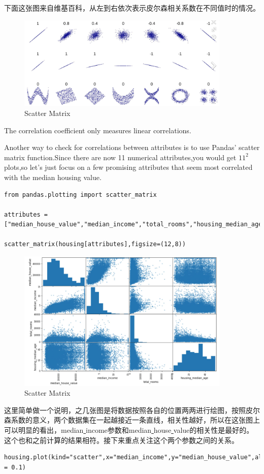 \documentclass[UTF8]{ctexart}
\begin{document}
下面这张图来自维基百科，从左到右依次表示皮尔森相关系数在不同值时的情况。

\begin{figure}[H]
\centering
\includegraphics[width = 4in]{scatter_matrix.JPG}
\caption{Scatter Matrix}
\end{figure}

The correlation coefficient only measures linear correlations.

Another way to check for correlations between attributes is to use Pandas' scatter\underline{ }matrix function.Since there are now 11 numerical attributes,you would get $11^2$ plots,so let's just focus on a few promising attributes that seem most correlated with the median housing value.

\begin{lstlisting}
from pandas.plotting import scatter_matrix

attributes = ["median_house_value","median_income","total_rooms","housing_median_age"]

scatter_matrix(housing[attributes],figsize=(12,8))
\end{lstlisting}


\begin{figure}[H]
\centering
\includegraphics[width = 4in]{scatter_col.JPG}
\caption{Scatter Matrix}
\end{figure}

这里简单做一个说明，之几张图是将数据按照各自的位置两两进行绘图，按照皮尔森系数的意义，两个数据集在一起越接近一条直线，相关性越好，所以在这张图上可以明显的看出，median\underline{ }income参数和median\underline{ }house\underline{ }value的相关性是最好的。这个也和之前计算的结果相符。接下来重点关注这个两个参数之间的关系。
\begin{lstlisting}
housing.plot(kind="scatter",x="median_income",y="median_house_value",alpha = 0.1)
\end{lstlisting}
\end{document}

